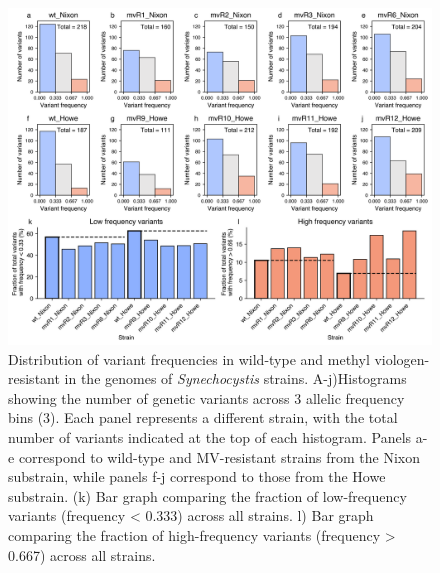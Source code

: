 \documentclass[12pt]{article}
\begin{document}
\begin{figure}[H]
    \centering
    \includegraphics[width=\hsize]{../Figures/WGS/variant_frequency_fraction_comparison_3bins.png}
    \caption{Distribution of variant frequencies in wild-type and methyl viologen-resistant in the genomes of \textit{Synechocystis} strains. A-j)Histograms showing the number of genetic variants across 3 allelic frequency bins (3). Each panel represents a different strain, with the total number of variants indicated at the top of each histogram. Panels a-e correspond to wild-type and MV-resistant strains from the Nixon substrain, while panels f-j correspond to those from the Howe substrain. (k) Bar graph comparing the fraction of low-frequency variants (frequency < 0.333) across all strains. l) Bar graph comparing the fraction of high-frequency variants (frequency > 0.667) across all strains.}
    \label{fig:3bins}
\end{figure}
\end{document}
